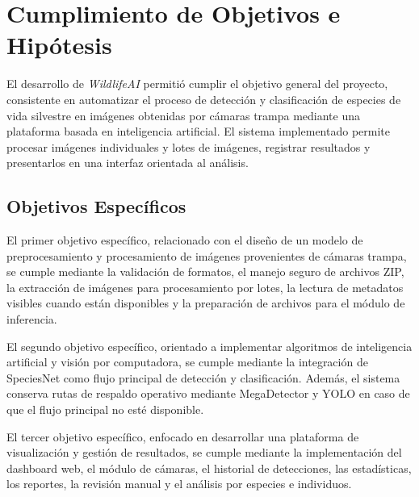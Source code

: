 \section{Cumplimiento de Objetivos e Hipótesis}
\label{sec:cumplimiento_objetivos_hipotesis}

El desarrollo de \textit{WildlifeAI} permitió cumplir el objetivo general del proyecto, consistente en automatizar el proceso de detección y clasificación de especies de vida silvestre en imágenes obtenidas por cámaras trampa mediante una plataforma basada en inteligencia artificial. El sistema implementado permite procesar imágenes individuales y lotes de imágenes, registrar resultados y presentarlos en una interfaz orientada al análisis.

\subsection{Objetivos Específicos}
\label{subsec:objetivos_especificos}

El primer objetivo específico, relacionado con el diseño de un modelo de preprocesamiento y procesamiento de imágenes provenientes de cámaras trampa, se cumple mediante la validación de formatos, el manejo seguro de archivos ZIP, la extracción de imágenes para procesamiento por lotes, la lectura de metadatos visibles cuando están disponibles y la preparación de archivos para el módulo de inferencia.

El segundo objetivo específico, orientado a implementar algoritmos de inteligencia artificial y visión por computadora, se cumple mediante la integración de SpeciesNet como flujo principal de detección y clasificación. Además, el sistema conserva rutas de respaldo operativo mediante MegaDetector y YOLO en caso de que el flujo principal no esté disponible.

El tercer objetivo específico, enfocado en desarrollar una plataforma de visualización y gestión de resultados, se cumple mediante la implementación del dashboard web, el módulo de cámaras, el historial de detecciones, las estadísticas, los reportes, la revisión manual y el análisis por especies e individuos.

